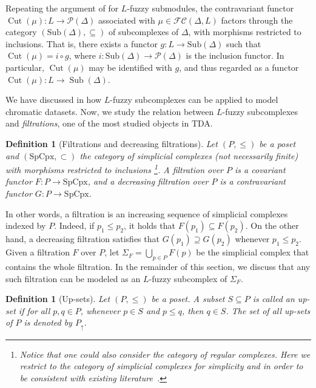 \documentclass[a4paper,10pt]{article}
\newtheorem{definition}[theorem]{Definition}
\newcommand{\calfc}{\mathcal{FC}}
\newcommand{\calp}{\mathcal{P}}
\DeclareMathOperator{\cut}{Cut}
\DeclareMathOperator{\sub}{Sub}
\newcommand{\SpCpx}{\textrm{SpCpx}}
\begin{document}
Repeating the argument of  for \(L\)-fuzzy submodules, the contravariant functor \(\cut(\mu): L \to \calp(\Delta)\) associated with \(\mu \in \calfc(\Delta,L)\) factors through the category \((\mathrm{Sub}(\Delta),\subseteq)\) of subcomplexes of \(\Delta\), with morphisms restricted to inclusions. That is, there exists a functor \(g: L \to \mathrm{Sub}(\Delta)\) such that \(\cut(\mu)= i \circ g\), where \(i: \mathrm{Sub}(\Delta) \to \calp(\Delta)\) is the inclusion functor. In particular, \(\cut(\mu)\) may be identified with \(g\), and thus regarded as a functor \(\cut(\mu): L \to \sub(\Delta)\).

We have discussed in  how \(L\)-fuzzy subcomplexes can be applied to model chromatic datasets. Now, we study the relation between \(L\)-fuzzy subcomplexes and \emph{filtrations}, one of the most studied objects in TDA.

\begin{definition}[Filtrations and decreasing filtrations]
\label{def:filtration}
Let \((P, \leq)\) be a poset and \((\SpCpx,\subset)\) the category of simplicial complexes (not necessarily finite) with morphisms restricted to inclusions \footnote{Notice that one could also consider the category of regular complexes. Here we restrict to the category of simplicial complexes for simplicity and in order to be consistent with existing literature~\cite{spivak2009metric}.}. 
A \emph{filtration} over \(P\) is a covariant functor $F\colon P \rightarrow \SpCpx$, and a \emph{decreasing filtration} over \(P\) is a contravariant functor $G\colon P \rightarrow \SpCpx$.
\end{definition}

In other words, a filtration is an increasing sequence of simplicial complexes indexed by \(P\). Indeed, if $p_1\leq p_2$, it holds that \(F(p_1) \subseteq F(p_2)\). On the other hand, a decreasing filtration satisfies that \(G(p_1) \supseteq G(p_2)\) whenever \(p_1 \leq p_2\).
Given a filtration \(F\) over \(P\), let \(\Sigma_F=\bigcup_{p \in P}F(p)\) be the simplicial complex that contains the whole filtration. In the remainder of this section, we discuss that any such filtration can be modeled as an \(L\)-fuzzy subcomplex of \(\Sigma_F\).

\begin{definition}[Up-sets]
\label{def:upset}
Let \((P,\leq)\) be a poset. A subset \(S \subseteq P\) is called an \emph{up-set} if for all \(p,q \in P\), whenever \(p \in S\) and \(p \le q\), then \(q \in S\). The set of all up-sets of \(P\) is denoted by \(P_\uparrow\).
\end{definition}
\end{document}
